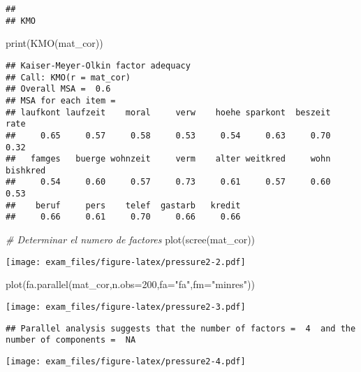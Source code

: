 \documentclass[
]{article}
\newenvironment{Shaded}{\begin{snugshade}}{\end{snugshade}}
\newcommand{\AttributeTok}[1]{\textcolor[rgb]{0.77,0.63,0.00}{#1}}
\newcommand{\CommentTok}[1]{\textcolor[rgb]{0.56,0.35,0.01}{\textit{#1}}}
\newcommand{\DecValTok}[1]{\textcolor[rgb]{0.00,0.00,0.81}{#1}}
\newcommand{\FunctionTok}[1]{\textcolor[rgb]{0.00,0.00,0.00}{#1}}
\newcommand{\NormalTok}[1]{#1}
\newcommand{\StringTok}[1]{\textcolor[rgb]{0.31,0.60,0.02}{#1}}
\begin{document}
\begin{verbatim}
## 
## KMO
\end{verbatim}

\begin{Shaded}
\begin{Highlighting}[]
  \FunctionTok{print}\NormalTok{(}\FunctionTok{KMO}\NormalTok{(mat\_cor))}
\end{Highlighting}
\end{Shaded}

\begin{verbatim}
## Kaiser-Meyer-Olkin factor adequacy
## Call: KMO(r = mat_cor)
## Overall MSA =  0.6
## MSA for each item = 
## laufkont laufzeit    moral     verw    hoehe sparkont  beszeit     rate 
##     0.65     0.57     0.58     0.53     0.54     0.63     0.70     0.32 
##   famges   buerge wohnzeit     verm    alter weitkred     wohn bishkred 
##     0.54     0.60     0.57     0.73     0.61     0.57     0.60     0.53 
##    beruf     pers    telef  gastarb   kredit 
##     0.66     0.61     0.70     0.66     0.66
\end{verbatim}

\begin{Shaded}
\begin{Highlighting}[]
  \CommentTok{\# Determinar el numero de factores}
  \FunctionTok{plot}\NormalTok{(}\FunctionTok{scree}\NormalTok{(mat\_cor))}
\end{Highlighting}
\end{Shaded}

\texttt{[image: exam\_files/figure-latex/pressure2-2.pdf]}

\begin{Shaded}
\begin{Highlighting}[]
  \FunctionTok{plot}\NormalTok{(}\FunctionTok{fa.parallel}\NormalTok{(mat\_cor,}\AttributeTok{n.obs=}\DecValTok{200}\NormalTok{,}\AttributeTok{fa=}\StringTok{"fa"}\NormalTok{,}\AttributeTok{fm=}\StringTok{"minres"}\NormalTok{))}
\end{Highlighting}
\end{Shaded}

\texttt{[image: exam\_files/figure-latex/pressure2-3.pdf]}

\begin{verbatim}
## Parallel analysis suggests that the number of factors =  4  and the number of components =  NA
\end{verbatim}

\texttt{[image: exam\_files/figure-latex/pressure2-4.pdf]}
\end{document}

